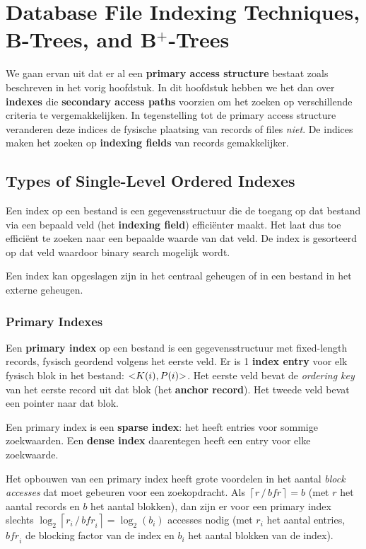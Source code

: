 \chapter[Database File Indexing Techniques, B-Trees, and B+-Trees]{Database File Indexing Techniques, B-Trees, and B$^+$-Trees}
We gaan ervan uit dat er al een \textbf{primary access structure} bestaat zoals beschreven in het vorig hoofdstuk. In dit hoofdstuk hebben we het dan over \textbf{indexes} die \textbf{secondary access paths} voorzien om het zoeken op verschillende criteria te vergemakkelijken. In tegenstelling tot de primary access structure veranderen deze indices de fysische plaatsing van records of files \textit{niet}. De indices maken het zoeken op \textbf{indexing fields} van records gemakkelijker.



\section{Types of Single-Level Ordered Indexes}
Een index op een bestand is een gegevensstructuur die de toegang op dat bestand via een bepaald veld (het \textbf{indexing field}) effici\"enter maakt. Het laat dus toe effici\"ent te zoeken naar een bepaalde waarde van dat veld. De index is gesorteerd op dat veld waardoor binary search mogelijk wordt. 

Een index kan opgeslagen zijn in het centraal geheugen of in een bestand in het externe geheugen.


\subsection{Primary Indexes}
Een \textbf{primary index} op een bestand is een gegevensstructuur met fixed-length records, fysisch geordend volgens het eerste veld. Er is 1 \textbf{index entry} voor elk fysisch blok in het bestand: $\text{\textless}K(i), P(i)\text{\textgreater}$. Het eerste veld bevat de \textit{ordering key} van het eerste record uit dat blok (het \textbf{anchor record}). Het tweede veld bevat een pointer naar dat blok.

Een primary index is een \textbf{sparse index}: het heeft entries voor sommige zoekwaarden. Een \textbf{dense index} daarentegen heeft een entry voor elke zoekwaarde.

Het opbouwen van een primary index heeft grote voordelen in het aantal \textit{block accesses} dat moet gebeuren voor een zoekopdracht. Als $\left\lceil r \,/\, \textit{bfr} \right\rceil = b$ (met $r$ het aantal records en $b$ het aantal blokken), dan zijn er voor een primary index slechts $\log_2 \left\lceil r_i \,/\, \textit{bfr}_i \right\rceil = \log_2 (b_i)$ accesses nodig (met $r_i$ het aantal entries, $\textit{bfr}_i$ de blocking factor van de index en $b_i$ het aantal blokken van de index).

